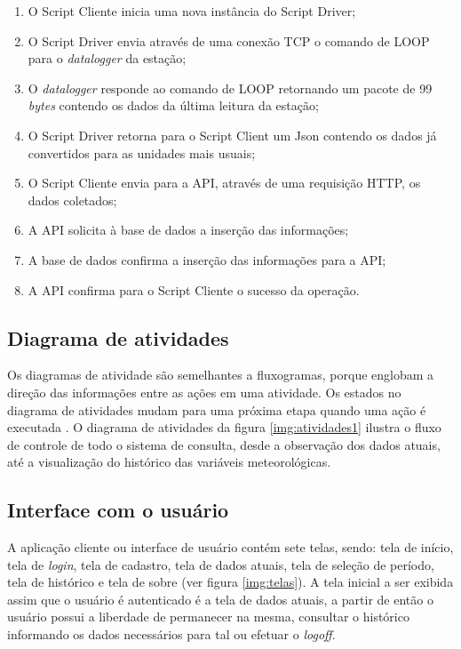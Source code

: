 \begin{enumerate}
	\item O Script Cliente inicia uma nova instância do Script Driver;
	\item O Script Driver envia através de uma conexão TCP o comando de LOOP para o \textit{datalogger} da estação;
	\item O \textit{datalogger} responde ao comando de LOOP retornando um pacote de 99 \textit{bytes} contendo os dados da última leitura da estação;
	\item O Script Driver retorna para o Script Client um Json contendo os dados já convertidos para as unidades mais usuais;
	\item O Script Cliente envia para a API, através de uma requisição HTTP, os dados coletados;
	\item A API solicita à base de dados a inserção das informações;
	\item A base de dados confirma a inserção das informações para a API;
	\item A API confirma para o Script Cliente o sucesso da operação.
\end{enumerate}

\subsection{Diagrama de atividades} \label{subsec:diagAtiv}

Os diagramas de atividade são semelhantes a fluxogramas, porque englobam a direção das informações entre as ações em uma atividade. Os estados no diagrama de atividades mudam para uma próxima etapa quando uma ação é executada \cite{SITEDIAGATIV}.  O diagrama de atividades da figura \ref{img:atividades1} ilustra o fluxo de controle de todo o sistema de consulta, desde a observação dos dados atuais, até a visualização do histórico das variáveis meteorológicas.


\newpage

\subsection{Interface com o usuário} \label{subsec:interfaceComOUsurario}

A aplicação cliente ou interface de usuário contém sete telas, sendo: tela de início, tela de \textit{login}, tela de cadastro, tela de dados atuais, tela de seleção de período, tela de histórico e tela de sobre  (ver figura \ref{img:telas}). A tela inicial a ser exibida assim que o usuário é autenticado é a tela de dados atuais, a partir de então o usuário possui a liberdade de permanecer na mesma, consultar o histórico informando os dados necessários para tal ou efetuar o \textit{logoff}.

